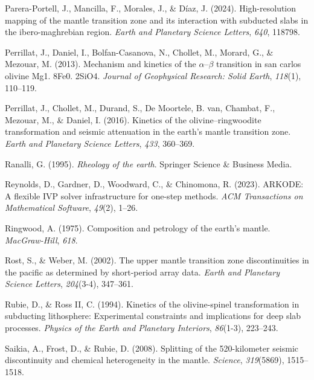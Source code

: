 \documentclass[
  paper=a4,
  ,captions=tableheading
]{scrartcl}
\newlength{\cslhangindent}
\newenvironment{CSLReferences}[2] %
  {\begin{list}{}{%
   \setlength{\itemindent}{0pt}
   \setlength{\leftmargin}{0pt}
   \setlength{\parsep}{0pt}
   \ifodd #1
    \setlength{\leftmargin}{\cslhangindent}
    \setlength{\itemindent}{-1\cslhangindent}
   \fi
   \setlength{\itemsep}{#2\baselineskip}}}
  {\end{list}}
\begin{document}
\begin{CSLReferences}{1}{0}
Parera-Portell, J., Mancilla, F., Morales, J., \& Díaz, J. (2024).
High-resolution mapping of the mantle transition zone and its
interaction with subducted slabs in the ibero-maghrebian region.
\emph{Earth and Planetary Science Letters}, \emph{640}, 118798.

Perrillat, J., Daniel, I., Bolfan-Casanova, N., Chollet, M., Morard, G.,
\& Mezouar, M. (2013). Mechanism and kinetics of the
\(\alpha\)--\(\beta\) transition in san carlos olivine Mg1. 8Fe0. 2SiO4.
\emph{Journal of Geophysical Research: Solid Earth}, \emph{118}(1),
110--119.

Perrillat, J., Chollet, M., Durand, S., De Moortele, B. van, Chambat,
F., Mezouar, M., \& Daniel, I. (2016). Kinetics of the
olivine--ringwoodite transformation and seismic attenuation in the
earth's mantle transition zone. \emph{Earth and Planetary Science
Letters}, \emph{433}, 360--369.

Ranalli, G. (1995). \emph{Rheology of the earth}. Springer Science \&
Business Media.

Reynolds, D., Gardner, D., Woodward, C., \& Chinomona, R. (2023).
ARKODE: A flexible IVP solver infrastructure for one-step methods.
\emph{ACM Transactions on Mathematical Software}, \emph{49}(2), 1--26.

Ringwood, A. (1975). Composition and petrology of the earth's mantle.
\emph{MacGraw-Hill}, \emph{618}.

Rost, S., \& Weber, M. (2002). The upper mantle transition zone
discontinuities in the pacific as determined by short-period array data.
\emph{Earth and Planetary Science Letters}, \emph{204}(3-4), 347--361.

Rubie, D., \& Ross II, C. (1994). Kinetics of the olivine-spinel
transformation in subducting lithosphere: Experimental constraints and
implications for deep slab processes. \emph{Physics of the Earth and
Planetary Interiors}, \emph{86}(1-3), 223--243.

Saikia, A., Frost, D., \& Rubie, D. (2008). Splitting of the
520-kilometer seismic discontinuity and chemical heterogeneity in the
mantle. \emph{Science}, \emph{319}(5869), 1515--1518.


\end{CSLReferences}
\end{document}
